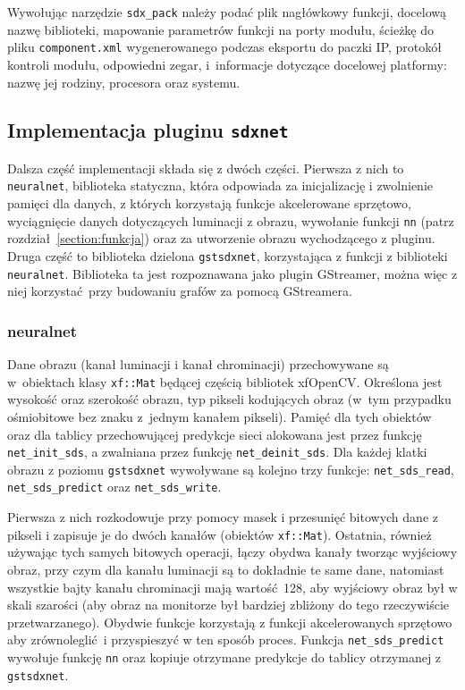 \documentclass[12pt, oneside, a4paper]{article}
\begin{document}
\hspace{1mm}
\begin{minipage}{0.95\linewidth}

\end{minipage}

Wywołując narzędzie \lstinline{sdx_pack} należy podać plik nagłówkowy funkcji,
docelową nazwę biblioteki, mapowanie parametrów funkcji na porty modułu,
ścieżkę do pliku \lstinline{component.xml} wygenerowanego podczas eksportu
do paczki IP, protokół kontroli modułu, odpowiedni zegar, i~informacje
dotyczące docelowej platformy: nazwę jej rodziny, procesora oraz systemu.

\subsection{Implementacja pluginu \texttt{sdxnet}}
Dalsza część implementacji składa się z dwóch części.
Pierwsza z nich to \lstinline{neuralnet}, biblioteka statyczna, która
odpowiada za inicjalizację i zwolnienie pamięci dla danych, z których
korzystają funkcje akcelerowane sprzętowo,
wyciągnięcie danych dotyczących luminacji z obrazu,
wywołanie funkcji \lstinline{nn} (patrz rozdział~\ref{section:funkcja}) oraz
za utworzenie obrazu wychodzącego z pluginu.
Druga część to biblioteka dzielona \lstinline{gstsdxnet}, korzystająca
z funkcji z biblioteki \lstinline{neuralnet}. Biblioteka ta jest rozpoznawana
jako plugin GStreamer, można więc z niej korzystać przy budowaniu
grafów za pomocą GStreamera.

\subsubsection{neuralnet}
Dane obrazu (kanał luminacji i kanał chrominacji)
przechowywane są w~obiektach klasy \lstinline{xf::Mat} będącej
częścią bibliotek xfOpenCV. Określona jest wysokość oraz szerokość obrazu,
typ pikseli kodujących obraz (w~tym przypadku ośmiobitowe bez znaku
z~jednym kanałem pikseli). Pamięć dla tych obiektów oraz dla tablicy
przechowującej predykcje sieci alokowana jest przez
funkcję \lstinline{net_init_sds}, a zwalniana przez funkcję
\lstinline{net_deinit_sds}. Dla każdej klatki obrazu z poziomu
\lstinline{gstsdxnet} wywoływane są kolejno trzy funkcje:
\lstinline{net_sds_read},
\lstinline{net_sds_predict} oraz
\lstinline{net_sds_write}.

Pierwsza z nich rozkodowuje przy pomocy masek i przesunięć bitowych
dane z pikseli i zapisuje je do dwóch kanałów (obiektów \lstinline{xf::Mat}).
Ostatnia, również używając tych samych bitowych operacji, łączy obydwa kanały
tworząc wyjściowy obraz, przy czym dla kanału luminacji są to dokładnie te
same dane, natomiast wszystkie bajty kanału chrominacji mają wartość 128,
aby wyjściowy obraz był w skali szarości (aby obraz na monitorze był bardziej
zbliżony do tego rzeczywiście przetwarzanego).
Obydwie funkcje korzystają z funkcji akcelerowanych
sprzętowo aby zrównoleglić i przyspieszyć w ten sposób proces.
Funkcja \lstinline{net_sds_predict} wywołuje funkcję \lstinline{nn} oraz
kopiuje otrzymane predykcje do tablicy otrzymanej z \lstinline{gstsdxnet}.
\end{document}
